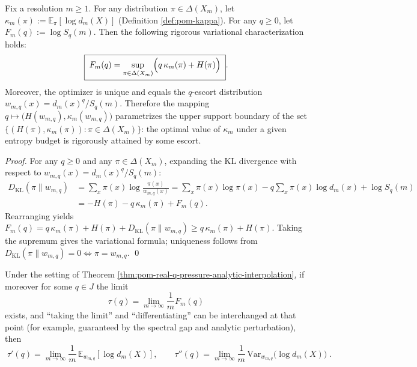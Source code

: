 



\begin{theorem}\label{thm:pom-kappa-gibbs-variational-escort-frontier}
Fix a resolution \(m\ge 1\). For any distribution \(\pi\in\Delta(X_m)\), let
\(
\kappa_m(\pi):=\mathbb{E}_{\pi}[\log d_m(X)]
\)
(Definition \ref{def:pom-kappa}).
For any \(q\ge 0\), let \(F_m(q):=\log S_q(m)\).
Then the following rigorous variational characterization holds:
\[
\boxed{\;
F_m(q)=\sup_{\pi\in\Delta(X_m)}\Bigl(q\,\kappa_m(\pi)+H(\pi)\Bigr)\; }.
\]
Moreover, the optimizer is unique and equals the \(q\)-escort distribution \(w_{m,q}(x)=d_m(x)^q/S_q(m)\).
Therefore the mapping
\(
q\mapsto \bigl(H(w_{m,q}),\kappa_m(w_{m,q})\bigr)
\)
parametrizes the upper support boundary of the set \(\{(H(\pi),\kappa_m(\pi)):\pi\in\Delta(X_m)\}\): the optimal value of \(\kappa_m\) under a given entropy budget is rigorously attained by some escort.
\end{theorem}
\begin{proof}
For any \(q\ge 0\) and any \(\pi\in\Delta(X_m)\), expanding the KL divergence with respect to \(w_{m,q}(x)=d_m(x)^q/S_q(m)\):
\[
\begin{aligned}
D_{\mathrm{KL}}(\pi\|w_{m,q})
&=\sum_x \pi(x)\log\frac{\pi(x)}{w_{m,q}(x)}
=\sum_x \pi(x)\log\pi(x)-q\sum_x \pi(x)\log d_m(x)+\log S_q(m)\\
&=-H(\pi)-q\,\kappa_m(\pi)+F_m(q).
\end{aligned}
\]
Rearranging yields
\(
F_m(q)=q\,\kappa_m(\pi)+H(\pi)+D_{\mathrm{KL}}(\pi\|w_{m,q})
\ge q\,\kappa_m(\pi)+H(\pi)
\).
Taking the supremum gives the variational formula; uniqueness follows from \(D_{\mathrm{KL}}(\pi\|w_{m,q})=0\Leftrightarrow \pi=w_{m,q}\). \qed
\end{proof}

\begin{corollary}\label{cor:pom-pressure-derivatives-from-escort}
Under the setting of Theorem \ref{thm:pom-real-q-pressure-analytic-interpolation}, if moreover for some \(q\in J\) the limit
\[
\tau(q)=\lim_{m\to\infty}\frac{1}{m}F_m(q)
\]
exists, and ``taking the limit'' and ``differentiating'' can be interchanged at that point (for example, guaranteed by the spectral gap and analytic perturbation), then
\[
\boxed{\;
\tau'(q)=\lim_{m\to\infty}\frac{1}{m}\,\mathbb{E}_{w_{m,q}}[\log d_m(X)],\qquad
\tau''(q)=\lim_{m\to\infty}\frac{1}{m}\,\mathrm{Var}_{w_{m,q}}\!\bigl(\log d_m(X)\bigr)\; }.
\]
\end{corollary}

